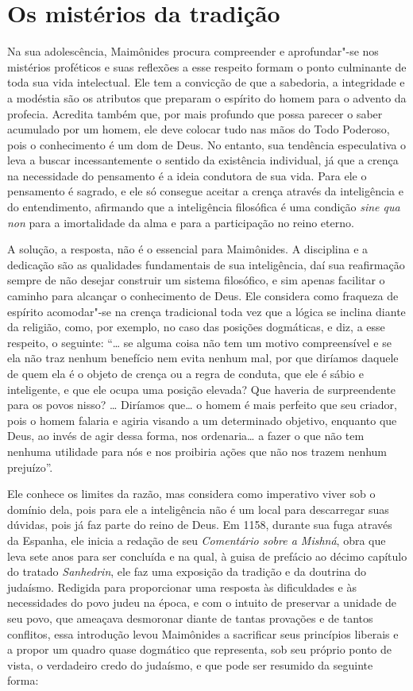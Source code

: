 \section{Os mistérios da tradição}

Na sua adolescência, Maimônides procura compreender e aprofundar"-se
nos mistérios proféticos e suas reflexões a esse respeito formam o ponto
culminante de toda sua vida intelectual. Ele tem a convicção de que a
sabedoria, a integridade e a modéstia são os atributos que preparam o
espírito do homem para o advento da profecia. Acredita também que, por
mais profundo que possa parecer o saber acumulado por um homem, ele deve
colocar tudo nas mãos do Todo Poderoso, pois o conhecimento é um dom de
Deus. No entanto, sua tendência especulativa o leva a buscar
incessantemente o sentido da existência individual, já que a crença na
necessidade do pensamento é a ideia condutora de sua vida. Para ele o
pensamento é sagrado, e ele só consegue aceitar a crença através da
inteligência e do entendimento, afirmando que a inteligência filosófica
é uma condição \emph{sine qua non} para a imortalidade da alma e para a
participação no reino eterno.

A solução, a resposta, não é o essencial para Maimônides. A disciplina e 
a dedicação são as qualidades fundamentais de sua inteligência, daí sua 
reafirmação sempre de não desejar construir um sistema filosófico, e sim 
apenas facilitar o caminho para alcançar o conhecimento de Deus. Ele considera 
como fraqueza de espírito acomodar"-se na crença tradicional toda vez que a lógica se inclina diante da religião, como, por exemplo, no caso das posições dogmáticas, e diz, a esse respeito, o seguinte: ``\ldots{} se alguma coisa não tem um motivo compreensível e se ela não traz nenhum benefício nem evita nenhum mal, por que diríamos daquele de quem ela é o objeto de crença ou a regra de conduta, que ele é sábio e inteligente, e que ele ocupa uma posição elevada? Que haveria de surpreendente para os povos nisso? \ldots{} Diríamos que\ldots{} o homem é mais perfeito que seu criador, pois o homem falaria e agiria visando a um determinado objetivo, enquanto que Deus, ao invés de agir dessa forma, nos ordenaria\ldots{} a fazer o que não tem nenhuma utilidade para nós e nos proibiria ações que não nos trazem nenhum prejuízo''. 

Ele conhece os limites da razão, mas considera como imperativo viver sob o domínio dela, pois para ele a inteligência não é um local para descarregar suas dúvidas, pois já faz parte do reino de Deus. Em 1158, durante sua fuga através da Espanha, ele inicia a redação de seu \emph{Comentário sobre a Mishná}, obra que leva sete anos para ser concluída e na qual, à guisa de prefácio ao décimo capítulo do tratado \emph{Sanhedrin}, ele faz uma exposição da tradição e da doutrina do judaísmo. Redigida para proporcionar uma resposta às dificuldades e às necessidades do povo judeu na época, e com o intuito de preservar a unidade de seu povo, que ameaçava desmoronar diante de tantas provações e de tantos conflitos, essa introdução levou Maimônides a sacrificar seus princípios liberais e a propor um quadro quase dogmático que representa, sob seu próprio ponto de vista, o verdadeiro credo do judaísmo, e que pode ser resumido da seguinte forma:

